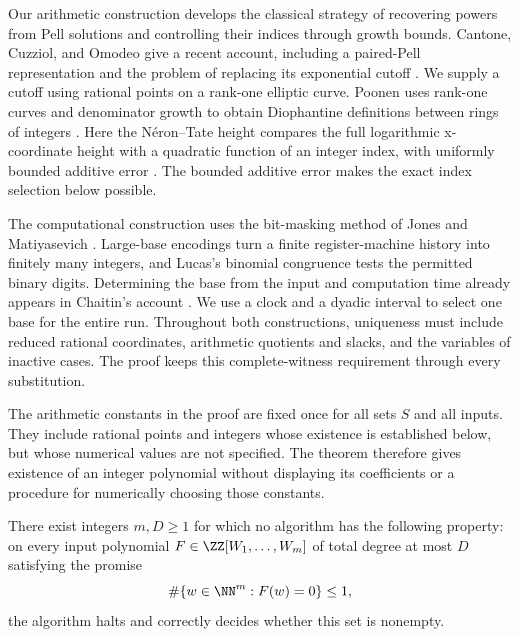 Our arithmetic construction develops the classical strategy of recovering
powers from Pell solutions and controlling their indices through growth
bounds. Cantone, Cuzziol, and Omodeo give a recent account, including a
paired-Pell representation and the problem of replacing its exponential
cutoff \cite[Section~6, Lemma~6.1 and Theorem~5; Section~7]{cco2024}.
We supply a cutoff using rational points on a rank-one elliptic curve.
Poonen uses rank-one curves and denominator growth to obtain Diophantine
definitions between rings of integers
\cite[Theorem~1 and Section~2.3, Lemma~8]{poonen2002}.
Here the N\'eron--Tate height compares the full logarithmic x-coordinate
height with a quadratic function of an integer index, with uniformly bounded
additive error \cite[Chapter~VIII, Proposition~9.1 and Theorem~9.3]{silverman}.
The bounded additive error makes the exact index selection below possible.

The computational construction uses the bit-masking method of Jones and
Matiyasevich \cite{jm1984,jm1991}. Large-base encodings turn a finite
register-machine history into finitely many integers, and Lucas's binomial
congruence tests the permitted binary digits. Determining the base from the
input and computation time already appears in Chaitin's account
\cite[Sections~2.3 and~2.6]{chaitin1987}. We use a clock and a dyadic
interval to select one base for the entire run. Throughout both constructions,
uniqueness must include reduced rational coordinates, arithmetic quotients
and slacks, and the variables of inactive cases. The proof keeps this
complete-witness requirement through every substitution.

The arithmetic constants in the proof are fixed once for all sets $S$ and
all inputs. They include rational points and integers whose existence is
established below, but whose numerical values are not specified. The theorem
therefore gives existence of an integer polynomial without displaying its
coefficients or a procedure for numerically choosing those constants.

\begin{corollary}
\label{cor:unique-h10}
There exist integers $m,D\ge1$ for which no algorithm has the following
property: on every input polynomial $F\in\ZZ[W_1,\ldots,W_m]$ of total
degree at most $D$ satisfying the promise
\[
 \#\{w\in\NN^m:F(w)=0\}\le1,
\]
the algorithm halts and correctly decides whether this set is nonempty.
\end{corollary}
